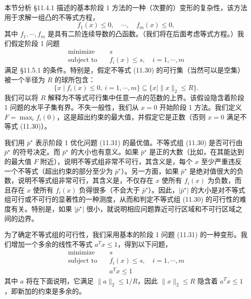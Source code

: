 \documentclass[UTF8, 12pt, fontset=fandol, oneside]{ctexart}
\begin{document}
本节分析 \S11.4.1 描述的基本阶段 1 方法的一种（次要的）变形的复杂性，该方法用于求解一组凸的不等式方程，
\begin{equation}
f_1(x)\leq 0,\quad \cdots,\quad f_m(x)\leq 0,
\tag{11.30}
\end{equation}
其中 $f_1,\cdots,f_m$ 是具有二阶连续导数的凸函数。（我们将在后面考虑等式方程。）我们假定阶段 1 问题
\begin{equation}
\begin{aligned}
\text{minimize}\quad & s\\
\text{subject to}\quad & f_i(x)\leq s,\quad i=1,\cdots,m
\end{aligned}
\tag{11.31}
\end{equation}
满足 \S11.5.1 的条件。特别是，假定不等式 (11.30) 的可行集（当然可以是空集）被一个半径为 $R$ 的球所包含：
\[
\{x\mid f_i(x)\leq 0,\ i=1,\cdots,m\}\subseteq \{x\mid \|x\|_2\leq R\}.
\]
我们可以将 $R$ 解释为不等式可行集中任意一点的范数的上界。该假设隐含着阶段 1 问题的水平子集有界。不失一般性，我们从 $x=0$ 开始阶段 1 方法。我们定义 $F=\max_i f_i(0)$，这是超出约束的最大值，并假定它是正数（否则 $x=0$ 满足不等式 (11.30)）。

我们用 $\bar{p}^\star$ 表示阶段 1 优化问题 (11.31) 的最优值。不等式组 (11.30) 是否可行由 $\bar{p}^\star$ 的符号决定。而 $\bar{p}^\star$ 的大小也有意义。如果 $\bar{p}^\star$ 是正的大数（比如，在其能达到的最大值 $F$ 附近），说明不等式组非常不可行，其含义是，每个 $x$ 至少严重违反一个不等式（超出约束的部分至少为 $\bar{p}^\star$）。另一方面，如果 $\bar{p}^\star$ 是绝对值很大的负数，说明不等式组非常可行，其含义是，不仅存在 $x$ 使所有 $f_i(x)$ 为负数，而且存在 $x$ 使所有 $f_i(x)$ 负得很多（不会大于 $\bar{p}^\star$）。因此，$|\bar{p}^\star|$ 的大小是对不等式组可行或不可行的显著性的一种测度，从而和判定不等式组 (11.30) 的可行性的难度有关。特别是，如果 $|\bar{p}^\star|$ 很小，就说明相应问题靠近可行区域和不可行区域之间的边界。

为了确定不等式组的可行性，我们采用基本的阶段 1 问题 (11.31) 的一种变形。我们增加一个多余的线性不等式 $a^Tx\leq 1$，得到以下问题，
\begin{equation}
\begin{aligned}
\text{minimize}\quad & s\\
\text{subject to}\quad & f_i(x)\leq s,\quad i=1,\cdots,m\\
& a^Tx\leq 1
\end{aligned}
\tag{11.32}
\end{equation}
其中 $a$ 将在下面说明，它满足 $\|a\|_2\leq 1/R$，因此 $\|x\|_2\leq R$ 隐含着 $a^Tx\leq 1$，即新加的约束是多余的。
\end{document}
